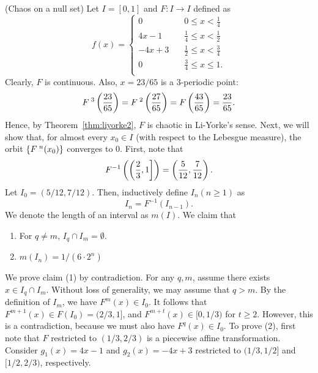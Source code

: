 \documentclass[10pt,draft,twoside]{book}
\begin{document}
\begin{example}
  (Chaos on a null set)
  Let $I = [0,1]$ and $F: I \to I$ defined as
  \begin{equation*}
    f(x) =
    \begin{cases}
      0 \quad & 0\leq x < \frac{1}{4} \\
      4x - 1 \quad  & \frac{1}{4} \leq x < \frac{1}{2} \\
      -4x + 3 \quad & \frac{1}{2} \leq x < \frac{3}{4} \\
      0 \quad & \frac{3}{4} \leq x \leq 1. \\
    \end{cases}
  \end{equation*}
  Clearly, $F$ is continuous.
  Also, $x = 23/65$ is a 3-periodic point:
  \begin{equation*}
    F^{\;3}\left ( \frac{23}{65} \right ) = F^{\;2}\left ( \frac{27}{65} \right ) = F\left ( \frac{43}{65} \right ) = \frac{23}{65}.
  \end{equation*}
Hence, by Theorem~\ref{thm:liyorke2}, $F$ is chaotic in Li-Yorke's sense.
%
Next, we will show that, for almost every $x_0 \in I$ (with respect to the Lebesgue measure), the orbit $\left \{ F^{\;n}(x_0) \right \}$ converges to 0.
First, note that 
\begin{equation*}
  F^{-1}\left ( \left(\frac{2}{3},1\right] \right ) 
  = \left ( \frac{5}{12},\frac{7}{12} \right ).
\end{equation*}
Let $I_0 = (5/12, 7/12)$.
Then, inductively define $I_n (n\geq 1)$ as 
\begin{equation*}
  I_n = F^{-1}(I_{n-1}).
\end{equation*}
%
We denote the length of an interval as $m(I)$.
We claim that
\begin{enumerate}[(1)]
  \item For $q\neq m$, $I_q \cap I_m = \emptyset$.
  \item $m(I_n) = 1/(6 \cdot 2^n)$
\end{enumerate}
%
We prove claim (1) by contradiction.
For any $q,m$, assume there exists $x \in I_q \cap I_m$. 
Without loss of generality, we may assume that $q > m$.
By the definition of $I_m$, we have $F^m(x) \in I_0$.
It follows that $F^{m+1}(x) \in F(I_0) = (2/3, 1]$, and $F^{m+t}(x) \in [0, 1/3)$ for $t \geq 2$.
However, this is a contradiction, because we must also have $F^q(x) \in I_0$.
%
To prove (2), first note that $F$ restricted to $(1/3, 2/3)$ is a piecewise affine transformation.
Consider $g_1(x) = 4x - 1$ and $g_2(x) = -4x + 3$ restricted to $(1/3,1/2]$ and $[1/2,2/3)$, respectively.

\end{example}
\end{document}
